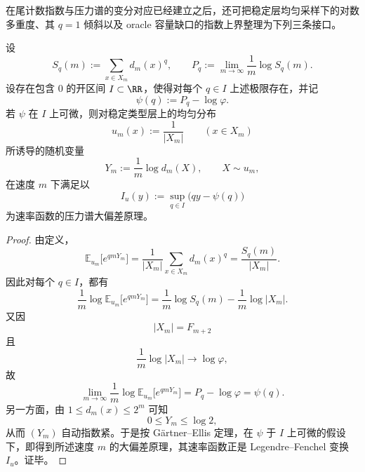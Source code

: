 在尾计数指数与压力谱的变分对应已经建立之后，还可把稳定层均匀采样下的对数多重度、其 \(q=1\) 倾斜以及 oracle 容量缺口的指数上界整理为下列三条接口。

\begin{theorem}[均匀类型采样下纤维对数多重度的压力谱大偏差原理]\label{thm:xi-time-part57eb-uniform-logmultiplicity-ldp}
设
\[
S_q(m):=\sum_{x\in X_m}d_m(x)^q,
\qquad
P_q:=\lim_{m\to\infty}\frac1m\log S_q(m).
\]
设存在包含 \(0\) 的开区间 \(I\subset\RR\)，使得对每个 \(q\in I\) 上述极限存在，并记
\[
\psi(q):=P_q-\log\varphi.
\]
若 \(\psi\) 在 \(I\) 上可微，则对稳定类型层上的均匀分布
\[
u_m(x):=\frac{1}{|X_m|}
\qquad (x\in X_m)
\]
所诱导的随机变量
\[
Y_m:=\frac1m\log d_m(X),
\qquad
X\sim u_m,
\]
在速度 \(m\) 下满足以
\[
I_u(y):=\sup_{q\in I}\bigl(qy-\psi(q)\bigr)
\]
为速率函数的压力谱大偏差原理。
\end{theorem}
\begin{proof}
由定义，
\[
\mathbb E_{u_m}\!\bigl[e^{qmY_m}\bigr]
=
\frac1{|X_m|}\sum_{x\in X_m}d_m(x)^q
=
\frac{S_q(m)}{|X_m|}.
\]
因此对每个 \(q\in I\)，都有
\[
\frac1m\log \mathbb E_{u_m}\!\bigl[e^{qmY_m}\bigr]
=
\frac1m\log S_q(m)-\frac1m\log|X_m|.
\]
又因
\[
|X_m|=F_{m+2}
\]
且
\[
\frac1m\log|X_m|\longrightarrow \log\varphi,
\]
故
\[
\lim_{m\to\infty}\frac1m\log \mathbb E_{u_m}\!\bigl[e^{qmY_m}\bigr]
=
P_q-\log\varphi
=
\psi(q).
\]
另一方面，由 \(1\le d_m(x)\le 2^m\) 可知
\[
0\le Y_m\le \log 2,
\]
从而 \((Y_m)\) 自动指数紧。于是按 Gärtner--Ellis 定理，在 \(\psi\) 于 \(I\) 上可微的假设下，即得到所述速度 \(m\) 的大偏差原理，其速率函数正是 Legendre--Fenchel 变换 \(I_u\)。证毕。
\end{proof}

